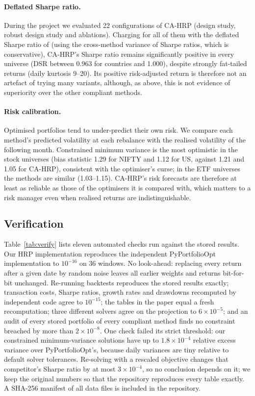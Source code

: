 \paragraph{Deflated Sharpe ratio.} During the project we evaluated 22 configurations of
CA-HRP (design study, robust design study and ablations). Charging for all of them with the
deflated Sharpe ratio of \citet{bailey2014} (using the cross-method variance of
Sharpe ratios, which is conservative), CA-HRP's Sharpe ratio remains significantly positive
in every universe (DSR between 0.963 for countries and 1.000), despite strongly fat-tailed
returns (daily kurtosis 9--20). Its positive risk-adjusted return is therefore not an
artefact of trying many variants, although, as above, this is not evidence of superiority over
the other compliant methods.

\paragraph{Risk calibration.} Optimised portfolios tend to under-predict their own risk. We
compare each method's predicted volatility at each rebalance with the realised volatility of
the following month. Constrained minimum variance is the most optimistic in the stock
universes (bias statistic 1.29 for NIFTY and 1.12 for US, against 1.21 and 1.05 for CA-HRP),
consistent with the optimiser's curse; in the ETF universes the methods are similar
(1.03--1.15). CA-HRP's risk forecasts are therefore at least as reliable as those of the
optimisers it is compared with, which matters to a risk manager even when realised returns
are indistinguishable.



\subsection{Verification}
Table~\ref{tab:verify} lists eleven automated checks run against the stored results. Our HRP
implementation reproduces the independent PyPortfolioOpt implementation \citep{martin2021} to $10^{-16}$ on
36 windows. No look-ahead: replacing every return after a given date by random noise leaves
all earlier weights and returns bit-for-bit unchanged. Re-running backtests reproduces the
stored results exactly; transaction costs, Sharpe ratios, growth rates and drawdowns
recomputed by independent code agree to $10^{-15}$; the tables in the paper equal a fresh
recomputation; three different solvers agree on the projection to $6\times10^{-5}$; and an
audit of every stored portfolio of every compliant method finds no constraint breached by
more than $2\times10^{-8}$. One check failed its strict threshold: our constrained
minimum-variance solutions have up to $1.8\times10^{-4}$ relative excess variance over
PyPortfolioOpt's, because daily variances are tiny relative to default solver tolerances.
Re-solving with a rescaled objective changes that competitor's Sharpe ratio by at most
$3\times10^{-4}$, so no conclusion depends on it; we keep the original numbers so that the
repository reproduces every table exactly. A SHA-256 manifest of all data files is included
in the repository.


